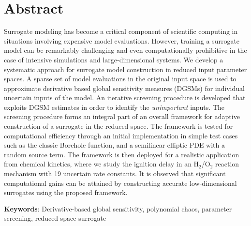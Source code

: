 \section*{Abstract}
Surrogate modeling has become a critical component of scientific computing
in situations involving expensive model evaluations. However, training a
surrogate model can be remarkably challenging and even computationally
prohibitive in the case of intensive simulations and large-dimensional
systems.
We develop a systematic approach for surrogate model
construction in reduced input parameter spaces.
%
A sparse set of model evaluations in the original input space is used to  
approximate derivative based global sensitivity measures (DGSMs) 
for individual uncertain inputs of the model.
An iterative screening procedure is developed that exploits DGSM estimates in
order to identify the \emph{unimportant} inputs. The screening procedure forms
an integral part of an overall framework for adaptive construction of a
surrogate in the reduced space. The framework is tested for computational
efficiency through an initial implementation in simple test cases such as the
classic Borehole function, and a semilinear elliptic PDE with a random source
term. 
The framework is then deployed for a realistic application from chemical
kinetics, where we study the ignition delay in an H$_2$/O$_2$ reaction
mechanism with 19 uncertain rate constants.  It is observed that significant
computational gains can be attained by constructing accurate low-dimensional
surrogates using the proposed framework.
\vspace{2mm}

\noindent
\textbf{Keywords}: Derivative-based global sensitivity,
polynomial chaos, parameter screening, reduced-space surrogate
 
